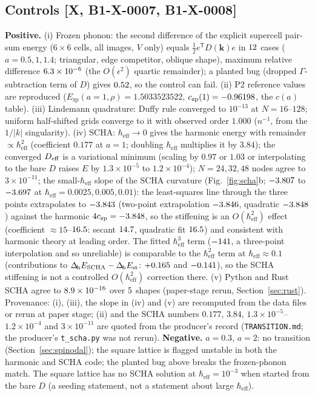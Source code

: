 \documentclass[10pt]{article}
\newcommand{\tier}[1]{\textsf{[#1]}}
\newcommand{\hb}{\hbar_{\mathrm{eff}}}
\newcommand{\Ezp}{E_{\mathrm{zp}}}
\newcommand{\Lap}{\Delta_{\!\mathrm{h}}}
\begin{document}
\subsection{Controls \tier{X, B1-X-0007, B1-X-0008}}\label{sec:controls}
\textbf{Positive.} (i) Frozen phonon: the second difference of the explicit supercell pair-sum energy ($6\times6$ cells, all images, $V$ only) equals $\tfrac12e^{\mathsf T}D(\mathbf k)e$ in $12$ cases ($a=0.5,1,1.4$; triangular, edge competitor, oblique shape), maximum relative difference $6.3\times10^{-6}$ (the $O(\epsilon^2)$ quartic remainder); a planted bug (dropped $\Gamma$-subtraction term of $D$) gives $0.52$, so the control can fail.
(ii) P2 reference values are reproduced ($\Ezp(a=1,\rho)=1.5033523522$, $c_{\mathrm{zp}}(1)=-0.96198$, the $c(a)$ table). (iii) Lindemann quadrature: Duffy rule converged to $10^{-13}$ at $N=16$--$128$; uniform half-shifted grids converge to it with observed order $1.000$ ($n^{-1}$, from the $1/|k|$ singularity). (iv) SCHA: $\hb\to0$ gives the harmonic energy with remainder $\propto\hb^2$ (coefficient $0.177$ at $a=1$; doubling $\hb$ multiplies it by $3.84$);
the converged $D_{\rm eff}$ is a variational minimum (scaling by $0.97$ or $1.03$ or interpolating to the bare $D$ raises $E$ by $1.3\times10^{-5}$ to $1.2\times10^{-4}$); $N=24,32,48$ nodes agree to $3\times10^{-11}$; the small-$\hb$ slope of the SCHA curvature (Fig.~\ref{fig:scha}b; $-3.807$ to $-3.697$ at $\hb=0.0025,0.005,0.01$): the least-squares line through the three points extrapolates to $-3.843$ (two-point extrapolation $-3.846$, quadratic $-3.848$) against the harmonic $4c_{\mathrm{zp}}=-3.848$, so the stiffening is an $O(\hb^2)$ effect (coefficient $\approx15$--$16.5$: secant $14.7$, quadratic fit $16.5$) and consistent with harmonic theory at leading order. The fitted $\hb^3$ term ($-141$, a three-point interpolation and so unreliable) is comparable to the $\hb^2$ term at $\hb\approx0.1$ (contributions to $\Lap E_{\rm SCHA}-\Lap E_{\rm st}$: $+0.165$ and $-0.141$), so the SCHA stiffening is not a controlled $O(\hb^2)$ correction there.
(v) Python and Rust SCHA agree to $8.9\times10^{-16}$ over $5$ shapes (paper-stage rerun, Section~\ref{sec:rust}).
Provenance: (i), (iii), the slope in (iv) and (v) are recomputed from the data files or rerun at paper stage; (ii) and the SCHA numbers $0.177$, $3.84$, $1.3\times10^{-5}$--$1.2\times10^{-4}$ and $3\times10^{-11}$ are quoted from the producer's record (\texttt{TRANSITION.md}; the producer's \texttt{t\_scha.py} was not rerun).
\textbf{Negative.} $a=0.3$, $a=2$: no transition (Section~\ref{sec:spinodal}); the square lattice is flagged unstable in both the harmonic and SCHA code; the planted bug above breaks the frozen-phonon match. The square lattice has no SCHA solution at $\hb=10^{-3}$ when started from the bare $D$ (a seeding statement, not a statement about large $\hb$).
\end{document}
